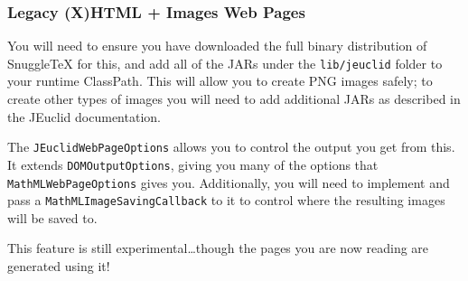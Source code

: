 \subsubsection*{Legacy (X)HTML + Images Web Pages}

You will need to ensure you have downloaded the full binary distribution of
SnuggleTeX for this, and add all of the JARs under the \verb|lib/jeuclid| folder
to your runtime ClassPath. This will allow you to create PNG images safely; to
create other types of images you will need to add additional JARs as described in
the JEuclid documentation.

The \verb|JEuclidWebPageOptions| allows you to control the output you
get from this. It extends \verb|DOMOutputOptions|, giving you many of the
options that \verb|MathMLWebPageOptions| gives you. Additionally, you will
need to implement and pass a \verb|MathMLImageSavingCallback| to it to control where
the resulting images will be saved to.

This feature is still experimental\ldots though the pages you are now reading
are generated using it!
